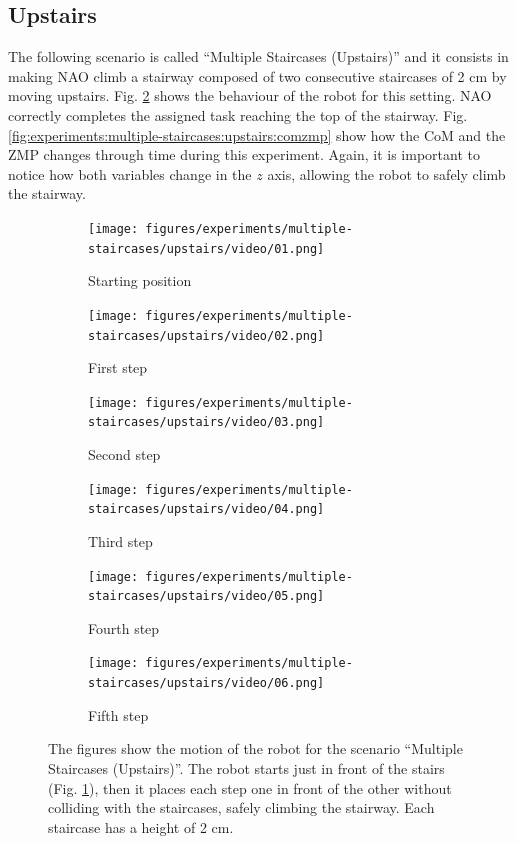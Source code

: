 \subsection{Upstairs}
The following scenario is called ``Multiple Staircases (Upstairs)'' and it 
consists in making NAO climb a stairway composed of two consecutive staircases 
of 2 cm by moving upstairs. Fig.
\ref{fig:experiments:multiple-staircases:upstairs:videoframes} shows the 
behaviour of the robot for this setting. NAO correctly completes the assigned 
task reaching the top of the stairway. Fig. 
\ref{fig:experiments:multiple-staircases:upstairs:comzmp} show how the CoM and 
the ZMP changes through time during this experiment. Again, it is important to 
notice how both variables change in the $z$ axis, allowing the robot to 
safely climb the stairway.
\begin{figure}
  \begin{subfigure}{0.48\textwidth}
    \texttt{[image: figures/experiments/multiple-staircases/upstairs/video/01.png]}
    \caption{Starting position}
    \label{fig:exp:ms:up:frame1}
  \end{subfigure}\hspace*{\fill}
  \begin{subfigure}{0.48\textwidth}
    \texttt{[image: figures/experiments/multiple-staircases/upstairs/video/02.png]}
    \caption{First step}
  \end{subfigure}
  \begin{subfigure}{0.48\textwidth}
    \texttt{[image: figures/experiments/multiple-staircases/upstairs/video/03.png]}
    \caption{Second step}
  \end{subfigure}\hspace*{\fill}
  \begin{subfigure}{0.48\textwidth}
    \texttt{[image: figures/experiments/multiple-staircases/upstairs/video/04.png]}
    \caption{Third step}
  \end{subfigure}
  \begin{subfigure}{0.48\textwidth}
    \texttt{[image: figures/experiments/multiple-staircases/upstairs/video/05.png]}
    \caption{Fourth step}
  \end{subfigure}\hspace*{\fill}
  \begin{subfigure}{0.48\textwidth}
    \texttt{[image: figures/experiments/multiple-staircases/upstairs/video/06.png]}
    \caption{Fifth step}
  \end{subfigure}
  \caption{The figures show the motion of the robot for the scenario
      ``Multiple Staircases (Upstairs)''. The robot starts just in 
      front of the stairs (Fig. \ref{fig:exp:ms:up:frame1}), then it places 
      each step one in front of the other without colliding with the staircases,
      safely climbing the stairway. Each staircase has a height of 2 cm.}
  \label{fig:experiments:multiple-staircases:upstairs:videoframes}
\end{figure}

